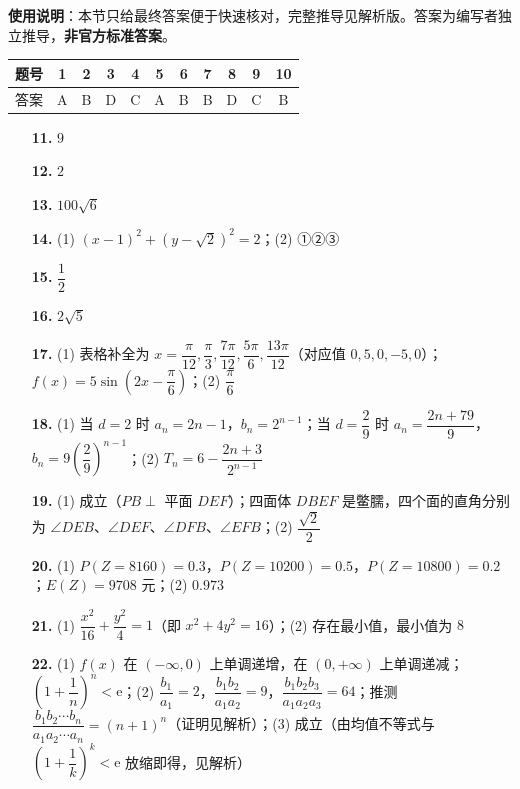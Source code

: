 
\begin{gknotice}
\textbf{使用说明}：本节只给最终答案便于快速核对，完整推导见解析版。答案为编写者独立推导，\textbf{非官方标准答案}。
\end{gknotice}

\begin{center}\begin{tabular}{ccccccccccc}
\toprule
题号 & 1 & 2 & 3 & 4 & 5 & 6 & 7 & 8 & 9 & 10 \\
\midrule
答案 & A & B & D & C & A & B & B & D & C & B \\
\bottomrule
\end{tabular}\end{center}

\begin{itemize}[leftmargin=2.6em]
  \item[\textbf{11.}] \(9\)
  \item[\textbf{12.}] \(2\)
  \item[\textbf{13.}] \(100\sqrt6\)
  \item[\textbf{14.}] (1) \((x-1)^2+(y-\sqrt2)^2=2\)；(2) ①②③
  \item[\textbf{15.}] \(\dfrac12\)
  \item[\textbf{16.}] \(2\sqrt5\)
\end{itemize}

\begin{itemize}[leftmargin=2.6em]
  \item[\textbf{17.}] (1) 表格补全为 \(x=\dfrac{\pi}{12},\dfrac{\pi}{3},\dfrac{7\pi}{12},\dfrac{5\pi}{6},\dfrac{13\pi}{12}\)（对应值 \(0,5,0,-5,0\)）；\(f(x)=5\sin\left(2x-\dfrac{\pi}{6}\right)\)；(2) \(\dfrac{\pi}{6}\)
  \item[\textbf{18.}] (1) 当 \(d=2\) 时 \(a_n=2n-1\)，\(b_n=2^{n-1}\)；当 \(d=\dfrac29\) 时 \(a_n=\dfrac{2n+79}{9}\)，\(b_n=9\left(\dfrac29\right)^{n-1}\)；(2) \(T_n=6-\dfrac{2n+3}{2^{n-1}}\)
  \item[\textbf{19.}] (1) 成立（\(PB\perp\) 平面 \(DEF\)）；四面体 \(DBEF\) 是鳖臑，四个面的直角分别为 \(\angle DEB\)、\(\angle DEF\)、\(\angle DFB\)、\(\angle EFB\)；(2) \(\dfrac{\sqrt2}{2}\)
  \item[\textbf{20.}] (1) \(P(Z=8160)=0.3\)，\(P(Z=10200)=0.5\)，\(P(Z=10800)=0.2\)；\(E(Z)=9708\) 元；(2) \(0.973\)
  \item[\textbf{21.}] (1) \(\dfrac{x^2}{16}+\dfrac{y^2}{4}=1\)（即 \(x^2+4y^2=16\)）；(2) 存在最小值，最小值为 \(8\)
  \item[\textbf{22.}] (1) \(f(x)\) 在 \((-\infty,0)\) 上单调递增，在 \((0,+\infty)\) 上单调递减；\(\left(1+\dfrac1n\right)^n<\mathrm{e}\)；(2) \(\dfrac{b_1}{a_1}=2\)，\(\dfrac{b_1b_2}{a_1a_2}=9\)，\(\dfrac{b_1b_2b_3}{a_1a_2a_3}=64\)；推测 \(\dfrac{b_1b_2\cdots b_n}{a_1a_2\cdots a_n}=(n+1)^n\)（证明见解析）；(3) 成立（由均值不等式与 \(\left(1+\dfrac1k\right)^k<\mathrm{e}\) 放缩即得，见解析）
\end{itemize}
